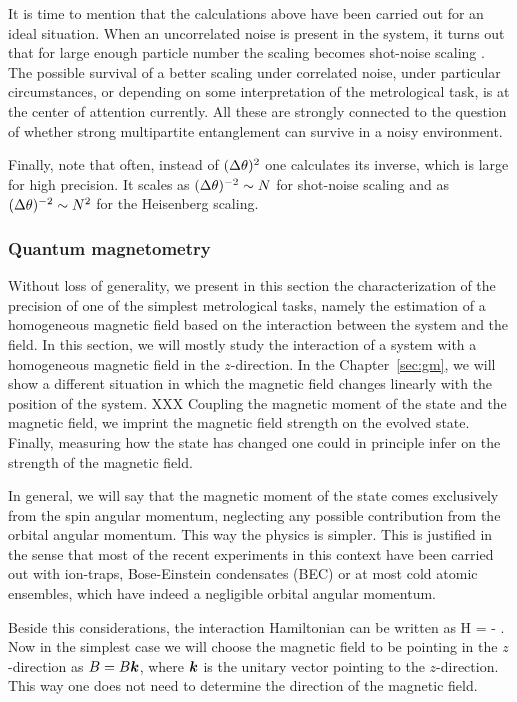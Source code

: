 It is time to mention that the calculations above have been carried out for an ideal situation.
When an uncorrelated noise is present in the system, it turns out that for large enough particle number the scaling becomes shot-noise scaling \cite{Demkowicz-Dobrzanski2012}.
The possible survival of a better scaling under correlated noise, under particular circumstances, or depending on some interpretation of the metrological task, is at the center of attention currently.
All these are strongly connected to the question of whether strong multipartite entanglement can survive in a noisy environment.

Finally, note that often, instead of $(\Delta \theta )^2$ one calculates its inverse, which is large for high precision.
It scales as $(\Delta \theta )^{-2}\sim N$ for shot-noise scaling and as $(\Delta \theta )^{-2}\sim N^2$ for the Heisenberg scaling.

\subsubsection{Quantum magnetometry}
\label{sec:bg-quantum-magnetometry}

Without loss of generality, we present in this section the characterization of the precision of one of the simplest metrological tasks, namely the estimation of a homogeneous magnetic field based on the interaction between the system and the field.
In this section, we will mostly study the interaction of a system with a homogeneous magnetic field in the $z$-direction.
In the Chapter~\ref{sec:gm}, we will show a different situation in which the magnetic field changes linearly with the position of the system.
XXX Coupling the magnetic moment of the state and the magnetic field,
we imprint the magnetic field strength on the evolved state.
Finally, measuring how the state has changed one could in principle infer on the strength of the magnetic field.

In general, we will say that the magnetic moment of the state comes exclusively from the spin angular momentum, neglecting any possible contribution from the orbital angular momentum.
This way the physics is simpler.
This is justified in the sense that most of the recent experiments in this context have been carried out with ion-traps, Bose-Einstein condensates (BEC) or at most cold atomic ensembles, which have indeed a negligible orbital angular momentum.

Beside this considerations, the interaction Hamiltonian can be written as
\be
  H = - \bs{\mu} \cdot {}.
\ee
Now in the simplest case we will choose the magnetic field to be pointing in the $z$-direction as ${B}=B\boldsymbol{k}$, where $\boldsymbol{k}$ is the unitary vector pointing to the $z$-direction.
This way one does not need to determine the direction of the magnetic field.

